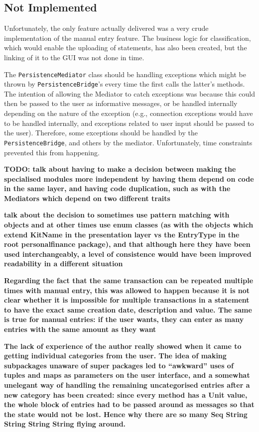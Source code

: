 \subsection{Not Implemented}
Unfortunately, the only feature actually delivered was a very crude
implementation of the manual entry feature.  The business logic for
classification, which would enable the uploading of statements, has also been
created, but the linking of it to the GUI was not done in time.

The \texttt{PersistenceMediator} class should be handling exceptions which
might be thrown by \texttt{PersistenceBridge}'s every time the first calls the
latter's methods. The intention of allowing the Mediator to catch exceptions
was because this could then be passed to the user as informative messages, or
be handled internally depending on the nature of the exception (e.g.,
connection exceptions would have to be handled internally, and exceptions
related to user input should be passed to the user). Therefore, some exceptions
should be handled by the \texttt{PersistenceBridge}, and others by the
mediator. Unfortunately, time constraints prevented this from happening.

\textbf{TODO: talk about having to make a decision between making the
specialised modules more independent by having them depend on code in the same
layer, and having code duplication, such as with the Mediators which depend on
two different traits}


\textbf{talk about the decision to sometimes use pattern matching with objects
and at other times use enum classes (as with the objects which extend KitName
in the presentation layer vs the EntryType in the root personalfinance
package), and that although here they have been used interchangeably, a level
of consistence would have been improved readability in a different situation}

\textbf{Regarding the fact that the same transaction can be repeated multiple
times with manual entry, this was allowed to happen because it is not clear
whether it is impossible for multiple transactions in a statement to have the
exact same creation date, description and value. The same is true for manual
entries: if the user wants, they can enter as many entries with the same amount
as they want}


\textbf{The lack of experience of the author really showed when it came to
getting individual categories from the user. The idea of making subpackages
unaware of super packages led to ``awkward'' uses of tuples and maps as
parameters on the user interface, and a somewhat unelegant way of handling the
remaining uncategorised entries after a new category has been created: since
every method has a Unit value, the whole block of entries had to be passed
around as messages so that the state would not be lost. Hence why there are so
many Seq String String String String flying around.}

